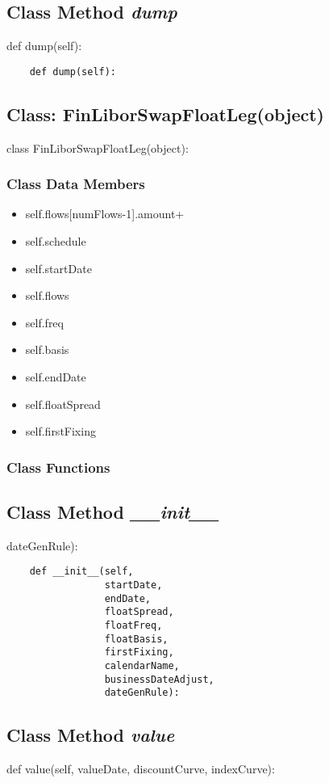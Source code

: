 \documentclass[twoside,11pt]{book}
\begin{document}
\subsection{Class Method {\it dump}}
def dump(self):

\begin{lstlisting}
    def dump(self):
\end{lstlisting}

\subsection{Class: FinLiborSwapFloatLeg(object)}
class FinLiborSwapFloatLeg(object):

\subsubsection{Class Data Members}
\begin{itemize}
\item{self.flows[numFlows-1].amount+}
\item{self.schedule}
\item{self.startDate}
\item{self.flows}
\item{self.freq}
\item{self.basis}
\item{self.endDate}
\item{self.floatSpread}
\item{self.firstFixing}
\end{itemize}

\subsubsection{Class Functions}

\subsection{Class Method {\it \_\_init\_\_}}
dateGenRule):

\begin{lstlisting}
    def __init__(self,
                 startDate,
                 endDate,
                 floatSpread,
                 floatFreq,
                 floatBasis,
                 firstFixing,
                 calendarName,
                 businessDateAdjust,
                 dateGenRule):
\end{lstlisting}

\subsection{Class Method {\it value}}
def value(self, valueDate, discountCurve, indexCurve):
\end{document}
